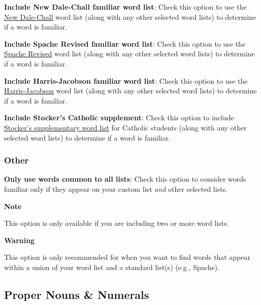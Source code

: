 \documentclass[
]{book}
\newenvironment{notesection}
    {
    \begin{tcolorbox}[colframe=mediumblue,colback=lightblue,coltext=mediumblue,arc=3mm]
    \faLightbulb[regular] \textbf{Note} \newline
    }
    {
    \end{tcolorbox}
    }
\newenvironment{warningsection}
    {
    \begin{tcolorbox}[colframe=lightgray,colback=lightpink,arc=3mm]
    \faLightbulb[regular] \textbf{{Warning} } \newline
    }
    {
    \end{tcolorbox}
    }
\theoremstyle{definition}
\theoremstyle{definition}
\theoremstyle{definition}
\theoremstyle{definition}
\theoremstyle{remark}
\begin{document}
\textbf{Include New Dale-Chall familiar word list}: Check this option to use the \protect\hyperlink{dale-chall-test}{New Dale-Chall} word list (along with any other selected word lists) to determine if a word is familiar.

\textbf{Include Spache Revised familiar word list}: Check this option to use the \protect\hyperlink{spache-test}{Spache Revised} word list (along with any other selected word lists) to determine if a word is familiar.

\textbf{Include Harris-Jacobson familiar word list}: Check this option to use the \protect\hyperlink{harris-jacobson}{Harris-Jacobson} word list (along with any other selected word lists) to determine if a word is familiar.

\textbf{Include Stocker's Catholic supplement}: Check this option to include \protect\hyperlink{stocker-catholic-supplement}{Stocker's supplementary word list} for Catholic students (along with any other selected word lists) to determine if a word is familiar.

\hypertarget{other}{%
\subsubsection*{Other}\label{other}}

\textbf{Only use words common to all lists}: Check this option to consider words familiar only if they appear on your custom list \emph{and} other selected lists.

\begin{notesection}
This option is only available if you are including two or more word lists.

\end{notesection}

\begin{warningsection}
This option is only recommended for when you want to find words that appear within a union of your word list and a standard list(s) (e.g., Spache).

\end{warningsection}

\hypertarget{custom-proper-numerals}{%
\subsection*{Proper Nouns \& Numerals}\label{custom-proper-numerals}}
\end{document}
